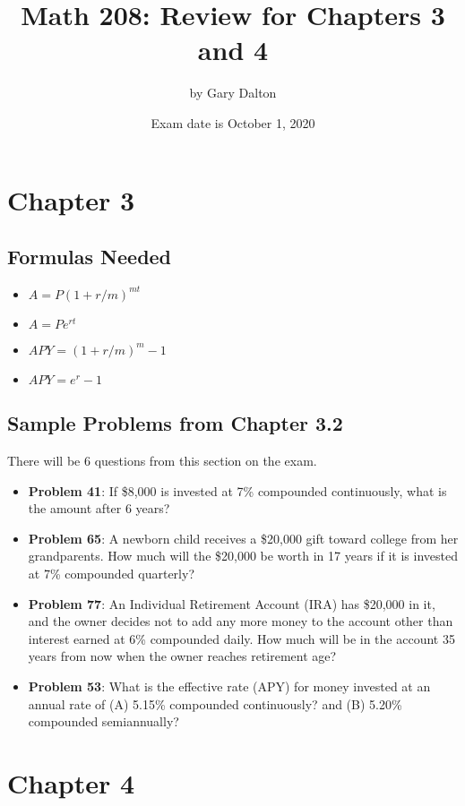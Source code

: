 \documentclass[12pt]{article}
\begin{document}
\title{Math 208: Review for Chapters 3 and 4}
\author{by Gary Dalton}
\date{Exam date is October 1, 2020}
\maketitle

\section*{Chapter 3}

\subsection*{Formulas Needed}
\begin{itemize}
\item $A = P(1+ r/m)^{mt}$
\item $A = Pe^{rt}$
\item $APY = (1 + r/m)^m -1$
\item $APY = e^r -1$
\end{itemize}

\subsection*{Sample Problems from Chapter 3.2}
There will be 6 questions from this section on the exam.
\begin{itemize}
\item \textbf{Problem 41}: If \$8,000 is invested at 7\% compounded continuously, what is the amount after 6 years?
\item \textbf{Problem 65}: A newborn child receives a \$20,000 gift toward college from her grandparents. How much will the \$20,000 be worth in 17 years if it is invested at 7\% compounded quarterly?
\item \textbf{Problem 77}:  An Individual Retirement Account (IRA) has \$20,000 in it, and the owner decides not to add any more money to the account other than interest earned at 6\% compounded daily. How much will be in the account 35 years from now when the owner reaches retirement age?
\item \textbf{Problem 53}: What is the effective rate (APY) for money invested at an annual rate of
(A) 5.15\% compounded continuously? and (B) 5.20\% compounded semiannually?

\end{itemize}

\section*{Chapter 4}
\end{document}
